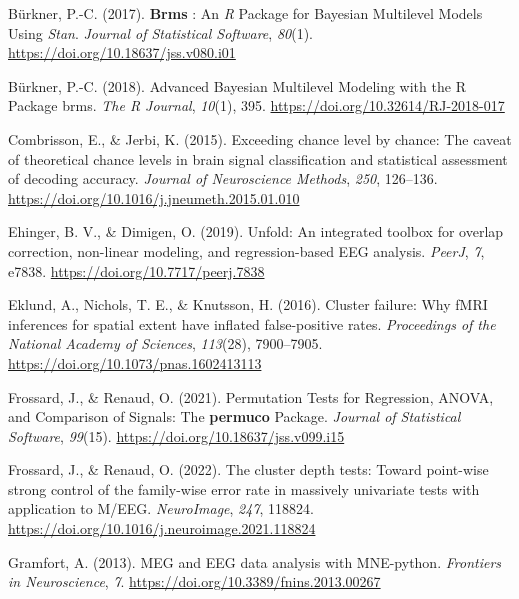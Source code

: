 \documentclass[
  doc,
  floatsintext,
  longtable,
  a4paper,
  nolmodern,
  notxfonts,
  notimes,
  colorlinks=true,linkcolor=blue,citecolor=blue,urlcolor=blue]{apa7}
\newlength{\cslhangindent}
\newenvironment{CSLReferences}[2] %
 {\begin{list}{}{%
  \setlength{\itemindent}{0pt}
  \setlength{\leftmargin}{0pt}
  \setlength{\parsep}{0pt}
  \ifodd #1
   \setlength{\leftmargin}{\cslhangindent}
   \setlength{\itemindent}{-1\cslhangindent}
  \fi
  \setlength{\itemsep}{#2\baselineskip}}}
 {\end{list}}
\begin{document}
\label{refs}
\begin{CSLReferences}{1}{0}
Bürkner, P.-C. (2017). \textbf{Brms} : {An} {{\emph{R}}} {Package} for
{Bayesian Multilevel Models Using} {{\emph{Stan}}}. \emph{Journal of
Statistical Software}, \emph{80}(1).
\url{https://doi.org/10.18637/jss.v080.i01}

Bürkner, P.-C. (2018). Advanced {Bayesian Multilevel Modeling} with the
{R Package} brms. \emph{The R Journal}, \emph{10}(1), 395.
\url{https://doi.org/10.32614/RJ-2018-017}

Combrisson, E., \& Jerbi, K. (2015). Exceeding chance level by chance:
{The} caveat of theoretical chance levels in brain signal classification
and statistical assessment of decoding accuracy. \emph{Journal of
Neuroscience Methods}, \emph{250}, 126--136.
\url{https://doi.org/10.1016/j.jneumeth.2015.01.010}

Ehinger, B. V., \& Dimigen, O. (2019). Unfold: An integrated toolbox for
overlap correction, non-linear modeling, and regression-based {EEG}
analysis. \emph{PeerJ}, \emph{7}, e7838.
\url{https://doi.org/10.7717/peerj.7838}

Eklund, A., Nichols, T. E., \& Knutsson, H. (2016). Cluster failure: Why
fMRI inferences for spatial extent have inflated false-positive rates.
\emph{Proceedings of the National Academy of Sciences}, \emph{113}(28),
7900--7905. \url{https://doi.org/10.1073/pnas.1602413113}

Frossard, J., \& Renaud, O. (2021). Permutation Tests for Regression,
ANOVA, and Comparison of Signals: The {\textbf{permuco}} Package.
\emph{Journal of Statistical Software}, \emph{99}(15).
\url{https://doi.org/10.18637/jss.v099.i15}

Frossard, J., \& Renaud, O. (2022). The cluster depth tests: Toward
point-wise strong control of the family-wise error rate in massively
univariate tests with application to M/EEG. \emph{NeuroImage},
\emph{247}, 118824.
\url{https://doi.org/10.1016/j.neuroimage.2021.118824}

Gramfort, A. (2013). MEG and EEG data analysis with MNE-python.
\emph{Frontiers in Neuroscience}, \emph{7}.
\url{https://doi.org/10.3389/fnins.2013.00267}


\end{CSLReferences}
\end{document}
